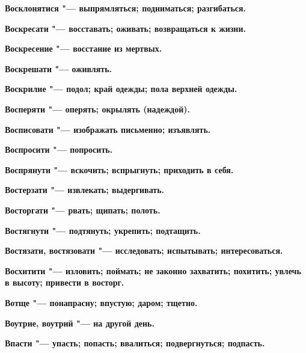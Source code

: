 \bfseries Восклонятися \normalfont{} "--- выпрямляться; подниматься; разгибаться. 




\bfseries Воскресати \normalfont{} "--- восставать; оживать; возвращаться к жизни. 




\bfseries Воскресение \normalfont{} "--- восстание из мертвых. 




\bfseries Воскрешати \normalfont{} "--- оживлять. 




\bfseries Воскрилие \normalfont{} "--- подол; край одежды; пола верхней одежды. 




\bfseries Восперяти \normalfont{} "--- оперять; окрылять (надеждой). 




\bfseries Восписовати \normalfont{} "--- изображать письменно; изъявлять. 




\bfseries Воспросити \normalfont{} "--- попросить. 




\bfseries Воспрянути \normalfont{} "--- вскочить; вспрыгнуть; приходить в себя. 




\bfseries Востерзати \normalfont{} "--- извлекать; выдергивать. 




\bfseries Восторгати \normalfont{} "--- рвать; щипать; полоть. 




\bfseries Востягнути \normalfont{} "--- подтянуть; укрепить; подтащить. 




\bfseries Востязати, востязовати \normalfont{} "--- исследовать; испытывать; интересоваться. 




\bfseries Восхитити \normalfont{} "--- изловить; поймать; не законно захватить; похитить; увлечь в высоту; привести в восторг. 




\bfseries Вотще \normalfont{} "--- понапрасну; впустую; даром; тщетно. 




\bfseries Воутрие, воутрий \normalfont{} "--- на другой день. 




\bfseries Впасти \normalfont{} "--- упасть; попасть; ввалиться; подвергнуться; подпасть. 




